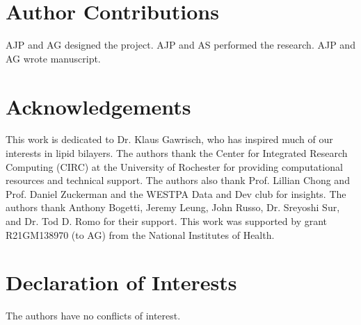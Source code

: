 \documentclass{biophys-new}
\begin{document}
\section*{Author Contributions}

AJP and AG designed the project. AJP and AS performed the research. AJP and AG wrote manuscript.

\section*{Acknowledgements}

This work is dedicated to Dr. Klaus Gawrisch, who has inspired much of our interests in lipid bilayers. The authors thank the Center for Integrated Research Computing (CIRC) at the University of Rochester for providing
computational resources and technical support. The authors also thank Prof. Lillian Chong and Prof. Daniel Zuckerman and
the WESTPA Data and Dev club for insights. The authors thank Anthony Bogetti, Jeremy Leung, John Russo, Dr. Sreyoshi Sur, and Dr. Tod D. Romo for their support.
This work was supported by grant R21GM138970 (to AG) from the National Institutes of Health.

\section*{Declaration of Interests}

The authors have no conflicts of interest.


\end{document}
